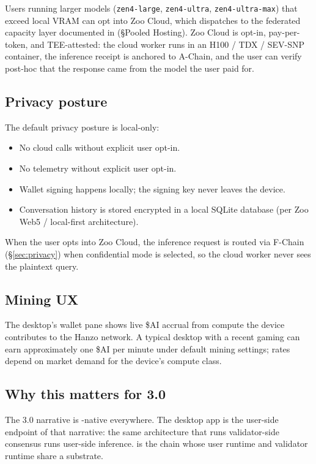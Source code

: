 Users running larger models (\texttt{zen4-large}, \texttt{zen4-ultra},
\texttt{zen4-ultra-max}) that exceed local VRAM can opt into Zoo Cloud,
which dispatches to the federated capacity layer documented in
\cite{zoo-per-llm-chains} (\S Pooled \GPU{} Hosting). Zoo Cloud is
opt-in, pay-per-token, and TEE-attested: the cloud worker runs in an
H100 / TDX / SEV-SNP container, the inference receipt is anchored to
A-Chain, and the user can verify post-hoc that the response came from
the model the user paid for.

\subsection{Privacy posture}

The default privacy posture is local-only:

\begin{itemize}[leftmargin=1.2em]
  \item No cloud calls without explicit user opt-in.
  \item No telemetry without explicit user opt-in.
  \item Wallet signing happens locally; the signing key never leaves
        the device.
  \item Conversation history is stored encrypted in a local SQLite
        database (per Zoo Web5 / local-first architecture).
\end{itemize}

When the user opts into Zoo Cloud, the inference request is routed via
\Lux{} F-Chain \FHE{} (\S\ref{sec:privacy}) when confidential mode is
selected, so the cloud worker never sees the plaintext query.

\subsection{Mining UX}

The desktop's wallet pane shows live \$AI accrual from compute the
device contributes to the Hanzo network. A typical desktop with a
recent gaming \GPU{} can earn approximately one \$AI per minute under
default mining settings; rates depend on market demand for the
device's compute class.

\subsection{Why this matters for \Zoo{} 3.0}

The \Zoo{} 3.0 narrative is \GPU{}-native everywhere. The desktop app
is the user-side endpoint of that narrative: the same \GPU{}
architecture that runs validator-side consensus runs user-side
inference. \Zoo{} is the chain whose user runtime and validator
runtime share a substrate.
